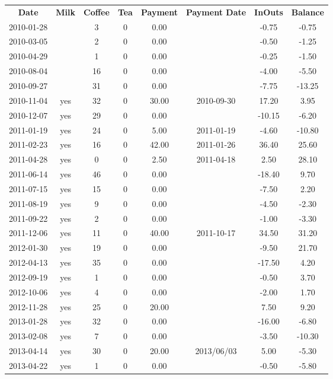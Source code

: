 \begin{center}
\begin{tabular}{cccccccc}
\textbf{Date} & \textbf{Milk} & \textbf{Coffee} & \textbf{Tea} & \textbf{Payment} & \textbf{Payment Date} & \textbf{InOuts} & \textbf{Balance} \\
2010-01-28 &  &  3 & 0 &  0.00 &  &  -0.75 &  -0.75\\ 
2010-03-05 &  &  2 & 0 &  0.00 &  &  -0.50 &  -1.25\\ 
2010-04-29 &  &  1 & 0 &  0.00 &  &  -0.25 &  -1.50\\ 
2010-08-04 &  & 16 & 0 &  0.00 &  &  -4.00 &  -5.50\\ 
2010-09-27 &  & 31 & 0 &  0.00 &  &  -7.75 & -13.25\\ 
2010-11-04 & yes & 32 & 0 & 30.00 & 2010-09-30 &  17.20 &   3.95\\ 
2010-12-07 & yes & 29 & 0 &  0.00 &  & -10.15 &  -6.20\\ 
2011-01-19 & yes & 24 & 0 &  5.00 & 2011-01-19 &  -4.60 & -10.80\\ 
2011-02-23 & yes & 16 & 0 & 42.00 & 2011-01-26 &  36.40 &  25.60\\ 
2011-04-28 & yes &  0 & 0 &  2.50 & 2011-04-18 &   2.50 &  28.10\\ 
2011-06-14 & yes & 46 & 0 &  0.00 &  & -18.40 &   9.70\\ 
2011-07-15 & yes & 15 & 0 &  0.00 &  &  -7.50 &   2.20\\ 
2011-08-19 & yes &  9 & 0 &  0.00 &  &  -4.50 &  -2.30\\ 
2011-09-22 & yes &  2 & 0 &  0.00 &  &  -1.00 &  -3.30\\ 
2011-12-06 & yes & 11 & 0 & 40.00 & 2011-10-17 &  34.50 &  31.20\\ 
2012-01-30 & yes & 19 & 0 &  0.00 &  &  -9.50 &  21.70\\ 
2012-04-13 & yes & 35 & 0 &  0.00 &  & -17.50 &   4.20\\ 
2012-09-19 & yes &  1 & 0 &  0.00 &  &  -0.50 &   3.70\\ 
2012-10-06 & yes &  4 & 0 &  0.00 &  &  -2.00 &   1.70\\ 
2012-11-28 & yes & 25 & 0 & 20.00 &  &   7.50 &   9.20\\ 
2013-01-28 & yes & 32 & 0 &  0.00 &  & -16.00 &  -6.80\\ 
2013-02-08 & yes &  7 & 0 &  0.00 &  &  -3.50 & -10.30\\ 
2013-04-14 & yes & 30 & 0 & 20.00 & 2013/06/03 &   5.00 &  -5.30\\ 
2013-04-22 & yes &  1 & 0 &  0.00 &  &  -0.50 &  -5.80
\end{tabular}
\end{center}

